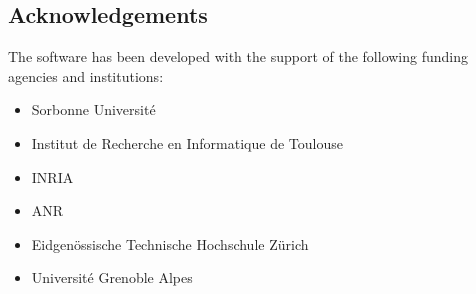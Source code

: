 \subsection{Acknowledgements}
\label{sec::HPDDM:acknowledgements}

The software has been developed with the support of the following funding agencies and institutions: 

\begin{itemize}
\item Sorbonne Université
\item Institut de Recherche en Informatique de Toulouse
\item INRIA
\item ANR
\item Eidgenössische Technische Hochschule Zürich
\item Université Grenoble Alpes
\end{itemize}

